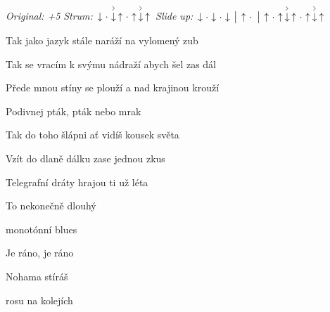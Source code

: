 \begin{song}


\begin{headerbox}
\RaiseBoxWithAccents
\textit{Original: +5} \quad
\textit{Strum:} $\Down\Miss\AccentDown\Up\Miss\Up\AccentDown\Up$ \quad
\textit{Slide up:} $\Down\Miss\Down\Miss\Down \Separator \Up\Miss \Separator \Up\Miss\Up\AccentDown\Up\Miss\Up\AccentDown\Up$
\end{headerbox}

\begin{hchordbox}
\end{hchordbox}

\large

\bigskip

Tak jako jazyk stále naráží na vylomený zub \par
Tak se vracím k svýmu nádraží abych šel zas dál \par
Přede mnou stíny se plouží a nad krajinou krouží \par
Podivnej pták,   pták nebo mrak \par

\bigskip

\begin{chorusbox}{\Refren}
Tak do toho šlápni ať vidíš kousek světa \par
Vzít do dlaně dálku  zase jednou zkus \par
Telegrafní dráty  hrajou ti už léta \par
To nekonečně dlouhý \par
{} monotónní blues \par

\bigskip

Je ráno, je ráno \par
Nohama stíráš \par
{}rosu na kolejích \par
\end{chorusbox}


\end{song}
